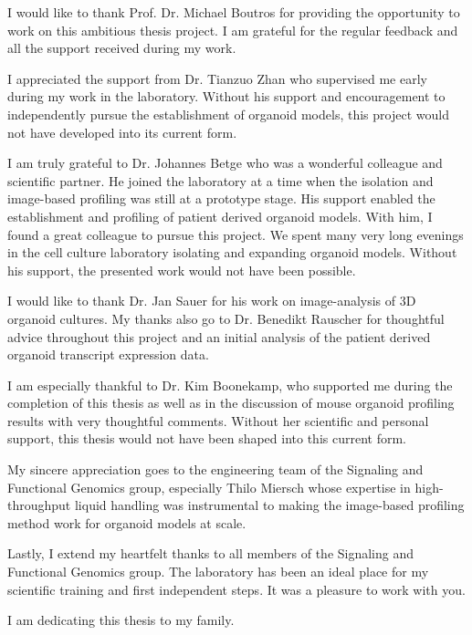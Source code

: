 \begin{flushleft}
I would like to thank Prof. Dr. Michael Boutros for providing the opportunity to work on this ambitious thesis project. I am grateful for the regular feedback and all the support received during my work.
\bigbreak

I appreciated the support from Dr. Tianzuo Zhan who supervised me early during my work in the laboratory. Without his support and encouragement to independently pursue the establishment of organoid models, this project would not have developed into its current form.  
\bigbreak

I am truly grateful to Dr. Johannes Betge who was a wonderful colleague and scientific partner. He joined the laboratory at a time when the isolation and image-based profiling was still at a  prototype stage. His support enabled the establishment and profiling of patient derived organoid models. With him, I found a great colleague to pursue this project. We spent many very long evenings in the cell culture laboratory isolating and expanding organoid models. Without his support, the presented work would not have been possible. 
\bigbreak

I would like to thank Dr. Jan Sauer for his work on image-analysis of 3D organoid cultures. My thanks also go to Dr. Benedikt Rauscher for thoughtful advice throughout this project and an initial analysis of the patient derived organoid transcript expression data.  
\bigbreak

I am especially thankful to Dr. Kim Boonekamp, who supported me during the completion of this thesis as well as in the discussion of mouse organoid profiling results with very thoughtful comments. Without her scientific and personal support, this thesis would not have been shaped into this current form.
\bigbreak

My sincere appreciation goes to the engineering team of the Signaling and Functional Genomics group, especially Thilo Miersch whose expertise in high-throughput liquid handling was instrumental to making the image-based profiling method work for organoid models at scale. 
\bigbreak

Lastly, I extend my heartfelt thanks to all members of the Signaling and Functional Genomics group. The laboratory has been an ideal place for my scientific training and first independent steps. It was a pleasure to work with you. 
\bigbreak

I am dedicating this thesis to my family.
\end{flushleft}